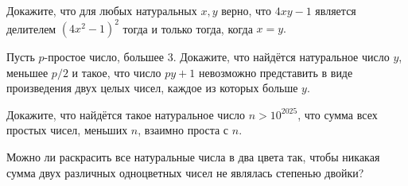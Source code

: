Докажите, что для любых натуральных $x, y$ верно, что $4xy-1$ является делителем $(4x^2-1)^2$ тогда и только тогда, когда $x = y.$

Пусть $p$-простое число, большее 3. Докажите, что найдётся натуральное число $y$, меньшее $p / 2$ и такое, что число $p y+1$ невозможно представить в виде произведения двух целых чисел, каждое из которых больше $y$.


Докажите, что найдётся такое натуральное число $n>10^{2025}$, что сумма всех простых чисел, меньших $n$, взаимно проста с $n$.

Можно ли раскрасить все натуральные числа в два цвета так, чтобы никакая сумма двух различных одноцветных чисел не являлась степенью двойки?